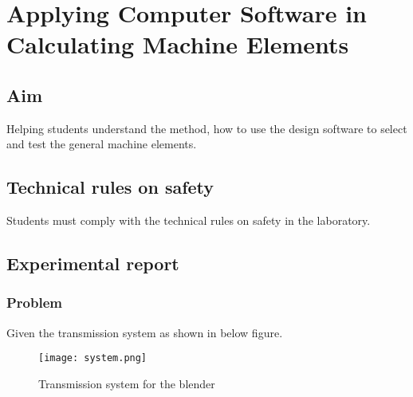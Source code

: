 \chapter{Applying Computer Software in Calculating Machine Elements}

\section{Aim}
Helping students understand the method, how to use the design software to select and test the general machine elements.
\section{Technical rules on safety}
Students must comply with the technical rules on safety in the laboratory.
\section{Experimental report}
\subsection{Problem}
Given the transmission system as shown in below figure.
\begin{figure}
	\centering
	\texttt{[image: system.png]}
	\caption{Transmission system for the blender}
	\label{blender}
\end{figure}

